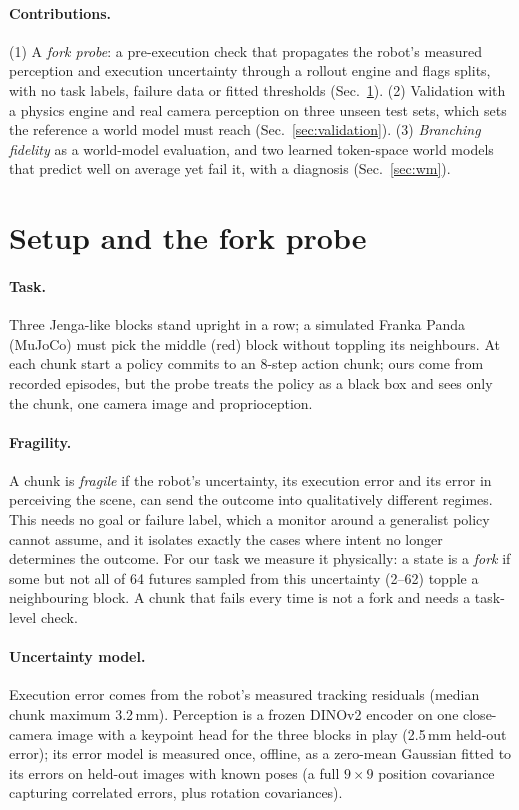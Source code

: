 \documentclass{article}
\begin{document}
\paragraph{Contributions.} (1) A \emph{fork probe}: a pre-execution check that propagates the robot's
measured perception and execution uncertainty through a rollout engine and flags splits, with no task
labels, failure data or fitted thresholds (Sec.~\ref{sec:probe}). (2) Validation with a physics engine and
real camera perception on three unseen test sets, which sets the reference a world model must reach
(Sec.~\ref{sec:validation}). (3) \emph{Branching fidelity} as a world-model evaluation, and two learned
token-space world models that predict well on average yet fail it, with a diagnosis (Sec.~\ref{sec:wm}).

\section{Setup and the fork probe}\label{sec:probe}
\paragraph{Task.} Three Jenga-like blocks stand upright in a row; a simulated Franka Panda (MuJoCo) must
pick the middle (red) block without toppling its neighbours. At each chunk start a policy commits to an 8-step action chunk; ours come from recorded episodes, but the probe treats
the policy as a black box and sees only the chunk, one camera image and proprioception.

\paragraph{Fragility.} A chunk is \emph{fragile} if the robot's uncertainty, its execution error and its
error in perceiving the scene, can send the outcome into qualitatively different regimes. This needs no
goal or failure label, which a monitor around a generalist policy cannot assume, and it isolates exactly
the cases where intent no longer determines the outcome. For our task we measure it physically: a state
is a \emph{fork} if some but not all of 64 futures sampled from this uncertainty (2--62) topple a
neighbouring block. A chunk that fails every time is not a fork and needs a task-level check.

\paragraph{Uncertainty model.} Execution error comes from the robot's measured tracking residuals
(median chunk maximum 3.2\,mm). Perception is a frozen DINOv2 encoder \citep{oquab2024dinov2} on one
close-camera image with a keypoint head for the three blocks in play (2.5\,mm held-out error); its error
model is measured once, offline, as a zero-mean Gaussian fitted to its errors on held-out images with
known poses (a full $9\times9$ position covariance capturing correlated errors, plus rotation covariances).
\end{document}
